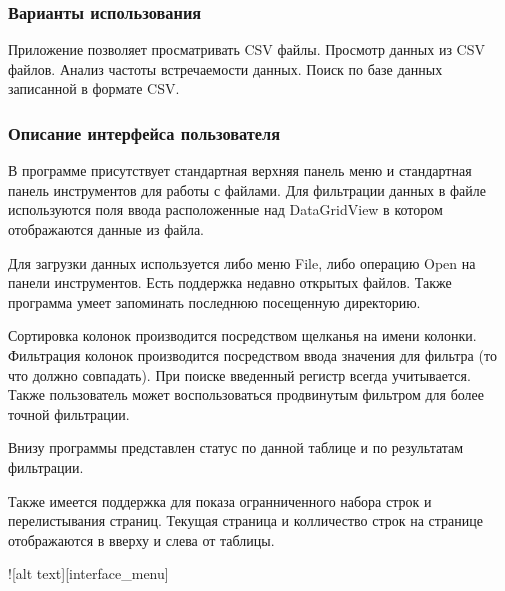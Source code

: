 \subsubsection*{Варианты использования}

Приложение позволяет просматривать C\+S\+V файлы. Просмотр данных из C\+S\+V файлов. Анализ частоты встречаемости данных. Поиск по базе данных записанной в формате C\+S\+V.

\subsubsection*{Описание интерфейса пользователя}

В программе присутствует стандартная верхняя панель меню и стандартная панель инструментов для работы с файлами. Для фильтрации данных в файле используются поля ввода расположенные над Data\+Grid\+View в котором отображаются данные из файла.

Для загрузки данных используется либо меню File, либо операцию Open на панели инструментов. Есть поддержка недавно открытых файлов. Также программа умеет запоминать последнюю посещенную директорию.

Сортировка колонок производится посредством щелканья на имени колонки. Фильтрация колонок производится посредством ввода значения для фильтра (то что должно совпадать). При поиске введенный регистр всегда учитывается. Также пользователь может воспользоваться продвинутым фильтром для более точной фильтрации.

Внизу программы представлен статус по данной таблице и по результатам фильтрации.

Также имеется поддержка для показа огранниченного набора строк и перелистывания страниц. Текущая страница и колличество строк на странице отображаются в вверху и слева от таблицы.

![alt text][interface\+\_\+menu] 